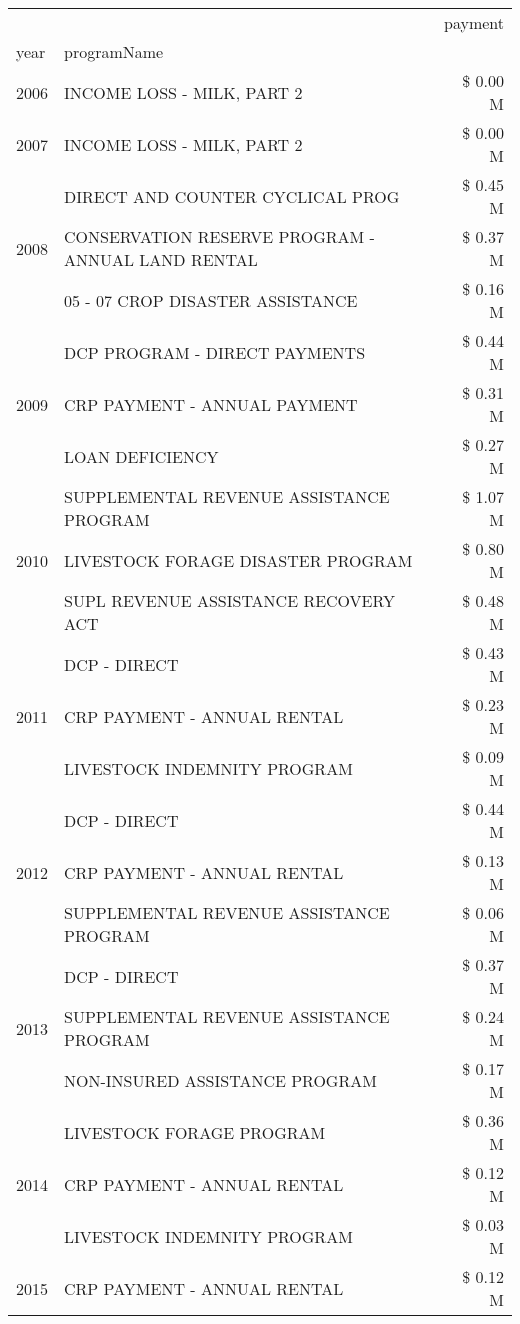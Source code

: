 \begin{tabular}{llr}
\toprule
 &  & payment \\
year & programName &  \\
\midrule
2006 & INCOME LOSS - MILK, PART 2 & \$ 0.00 M \\
\cline{1-3}
2007 & INCOME LOSS - MILK, PART 2 & \$ 0.00 M \\
\cline{1-3}
\multirow[t]{3}{*}{2008} & DIRECT AND COUNTER CYCLICAL PROG & \$ 0.45 M \\
 & CONSERVATION RESERVE PROGRAM - ANNUAL LAND RENTAL & \$ 0.37 M \\
 & 05 - 07 CROP DISASTER ASSISTANCE & \$ 0.16 M \\
\cline{1-3}
\multirow[t]{3}{*}{2009} & DCP PROGRAM - DIRECT PAYMENTS & \$ 0.44 M \\
 & CRP PAYMENT - ANNUAL PAYMENT & \$ 0.31 M \\
 & LOAN DEFICIENCY & \$ 0.27 M \\
\cline{1-3}
\multirow[t]{3}{*}{2010} & SUPPLEMENTAL REVENUE ASSISTANCE PROGRAM & \$ 1.07 M \\
 & LIVESTOCK FORAGE DISASTER  PROGRAM & \$ 0.80 M \\
 & SUPL REVENUE ASSISTANCE RECOVERY ACT & \$ 0.48 M \\
\cline{1-3}
\multirow[t]{3}{*}{2011} & DCP - DIRECT & \$ 0.43 M \\
 & CRP PAYMENT - ANNUAL RENTAL & \$ 0.23 M \\
 & LIVESTOCK INDEMNITY PROGRAM & \$ 0.09 M \\
\cline{1-3}
\multirow[t]{3}{*}{2012} & DCP - DIRECT & \$ 0.44 M \\
 & CRP PAYMENT - ANNUAL RENTAL & \$ 0.13 M \\
 & SUPPLEMENTAL REVENUE ASSISTANCE PROGRAM & \$ 0.06 M \\
\cline{1-3}
\multirow[t]{3}{*}{2013} & DCP - DIRECT & \$ 0.37 M \\
 & SUPPLEMENTAL REVENUE ASSISTANCE PROGRAM & \$ 0.24 M \\
 & NON-INSURED ASSISTANCE PROGRAM & \$ 0.17 M \\
\cline{1-3}
\multirow[t]{3}{*}{2014} & LIVESTOCK FORAGE PROGRAM & \$ 0.36 M \\
 & CRP PAYMENT - ANNUAL RENTAL & \$ 0.12 M \\
 & LIVESTOCK INDEMNITY PROGRAM & \$ 0.03 M \\
\cline{1-3}
\multirow[t]{3}{*}{2015} & CRP PAYMENT - ANNUAL RENTAL & \$ 0.12 M \\

\end{tabular}
